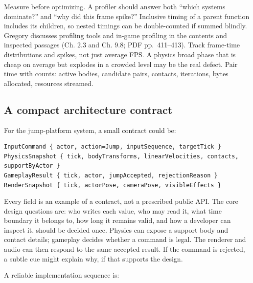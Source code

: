 Measure before optimizing. A profiler should answer both ``which systems dominate?'' and ``why did this frame spike?'' Inclusive timing of a parent function includes its children, so nested timings can be double-counted if summed blindly. Gregory discusses profiling tools and in-game profiling in the contents and inspected passages (Ch. 2.3 and Ch. 9.8; PDF pp.~411--413). Track frame-time distributions and spikes, not just average FPS. A physics broad phase that is cheap on average but explodes in a crowded level may be the real defect. Pair time with counts: active bodies, candidate pairs, contacts, iterations, bytes allocated, resources streamed.

\subsection{A compact architecture contract}\label{06-engine-ii-ch041-a-compact-architecture-contract}

\hypertarget{06-engine-ii-ch041-a-compact-architecture-contract}{}

For the jump-platform system, a small contract could be:

\begin{verbatim}
InputCommand { actor, action=Jump, inputSequence, targetTick }
PhysicsSnapshot { tick, bodyTransforms, linearVelocities, contacts, supportByActor }
GameplayResult { tick, actor, jumpAccepted, rejectionReason }
RenderSnapshot { tick, actorPose, cameraPose, visibleEffects }
\end{verbatim}

Every field is an example of a contract, not a prescribed public API. The core design questions are: who writes each value, who may read it, what time boundary it belongs to, how long it remains valid, and how a developer can inspect it.  should be decided once. Physics can expose a support body and contact details; gameplay decides whether a command is legal. The renderer and audio can then respond to the same accepted result. If the command is rejected, a subtle cue might explain why, if that supports the design.

A reliable implementation sequence is:

